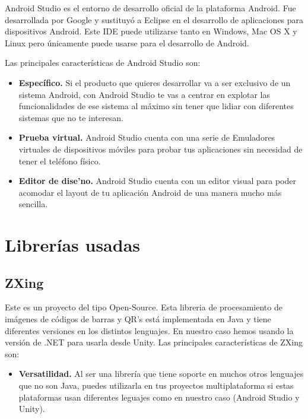 Android Studio es el entorno de desarrollo oficial de la plataforma Android. Fue desarrollada por Google y sustituy\'o a Eclipse en el desarrollo de aplicaciones para dispositivos Android. Este IDE puede utilizarse tanto en Windows, Mac OS X y Linux pero \'unicamente puede usarse para el desarrollo de Android.

Las principales caracter\'isticas de Android Studio son:

\begin{itemize}

\item \textbf{Espec\'ifico.} Si el producto que quieres desarrollar va a ser exclusivo de un sistema Android, con Android Studio te vas a centrar en explotar las funcionalidades de ese sistema al m\'aximo sin tener que lidiar con diferentes sistemas que no te interesan.
\item \textbf{Prueba virtual.} Android Studio cuenta con una serie de Emuladores virtuales de dispositivos m\'oviles para probar tus aplicaciones sin necesidad de tener el tel\'efono f\'isico.
\item \textbf{Editor de dise'no.} Android Studio cuenta con un editor visual para poder acomodar el layout de tu aplicaci\'on Android de una manera mucho m\'as sencilla.

\end{itemize}
\section{Librer\'ias usadas}
\subsection{ZXing}
\label{cap2:subsec:zxing}

Este es un proyecto del tipo Open-Source. Esta libreria de procesamiento de im\'agenes de c\'odigos de barras y QR's est\'a implementada en Java y tiene diferentes versiones en los distintos lenguajes. En nuestro caso hemos usando la versi\'on de .NET para usarla desde Unity.
Las principales caracter\'isticas de ZXing son:

\begin{itemize}

\item \textbf{Versatilidad.} Al ser una librer\'ia que tiene soporte en muchos otros lenguajes que no son Java, puedes utilizarla en tus proyectos multiplataforma si estas plataformas usan diferentes leguajes como en nuestro caso (Android Studio y Unity).

\end{itemize}
